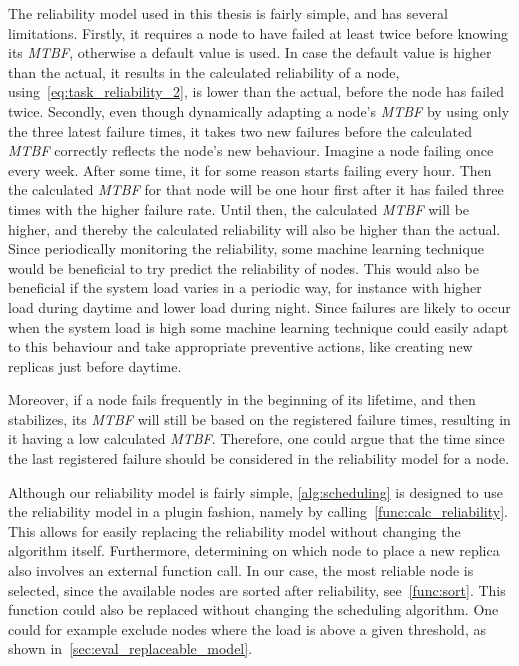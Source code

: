 \documentclass{cslthse-msc}
\begin{document}
The reliability model used in this thesis is fairly simple, and has several limitations. Firstly, it requires a node to have failed at least twice before knowing its \emph{MTBF}, otherwise a default value is used. In case the default value is higher than the actual, it results in the calculated reliability of a node, using~\cref{eq:task_reliability_2}, is lower than the actual, before the node has failed twice. Secondly, even though dynamically adapting a node's \emph{MTBF} by using only the three latest failure times, it takes two new failures before the calculated \emph{MTBF} correctly reflects the node's new behaviour. Imagine a node failing once every week. After some time, it for some reason starts failing every hour. Then the calculated \emph{MTBF} for that node will be one hour first after it has failed three times with the higher failure rate. Until then, the calculated \emph{MTBF} will be higher, and thereby the calculated reliability will also be higher than the actual. Since periodically monitoring the reliability, some machine learning technique would be beneficial to try predict the reliability of nodes. This would also be beneficial if the system load varies in a periodic way, for instance with higher load during daytime and lower load during night. Since failures are likely to occur when the system load is high some machine learning technique could easily adapt to this behaviour and take appropriate preventive actions, like creating new replicas just before daytime.

Moreover, if a node fails frequently in the beginning of its lifetime, and then stabilizes, its \emph{MTBF} will still be based on the registered failure times, resulting in it having a low calculated \emph{MTBF}. Therefore, one could argue that the time since the last registered failure should be considered in the reliability model for a node.

Although our reliability model is fairly simple, \cref{alg:scheduling} is designed to use the reliability model in a plugin fashion, namely by calling~\cref{func:calc_reliability}. This allows for easily replacing the reliability model without changing the algorithm itself. Furthermore, determining on which node to place a new replica also involves an external function call. In our case, the most reliable node is selected, since the available nodes are sorted after reliability, see~\cref{func:sort}. This function could also be replaced without changing the scheduling algorithm. One could for example exclude nodes where the load is above a given threshold, as shown in~\cref{sec:eval_replaceable_model}.
\end{document}
